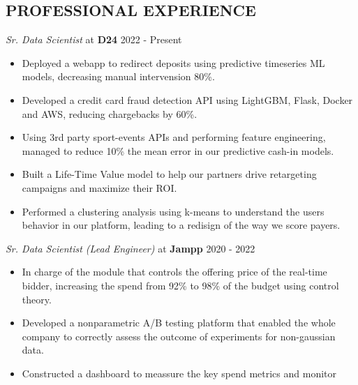 \documentclass[margin]{res}
\begin{document}
\begin{resume}
    \section{PROFESSIONAL EXPERIENCE} 
    {\sl Sr. Data Scientist} at {\bf D24} \hfill 2022 - Present
    \begin{itemize}  \itemsep -2pt %
        \item Deployed a webapp to redirect deposits using predictive timeseries ML models, decreasing
            manual intervension 80\%.
        \item Developed a credit card fraud detection API using LightGBM, Flask, Docker and AWS, 
            reducing chargebacks by 60\%.
        \item Using 3rd party sport-events APIs and performing feature engineering, managed to 
            reduce 10\% the mean error in our predictive cash-in models.
        \item Built a Life-Time Value model to help our partners drive retargeting campaigns and maximize their ROI.
        \item Performed a clustering analysis using k-means to understand the users behavior in our platform, 
            leading to a redisign of the way we score payers.
    \end{itemize}
    {\sl Sr. Data Scientist (Lead Engineer)} at {\bf Jampp} \hfill 2020 - 2022
    \begin{itemize}  \itemsep -2pt %
        \item In charge of the module that controls the offering price of the
            real-time bidder, increasing the spend from 92\% to 98\%
            of the budget using control theory.
        \item Developed a nonparametric A/B testing platform that enabled the whole company to 
            correctly assess the outcome of experiments for non-gaussian data. 
        \item Constructed a dashboard to meassure the key spend metrics and monitor

\end{itemize}
\end{resume}
\end{document}
